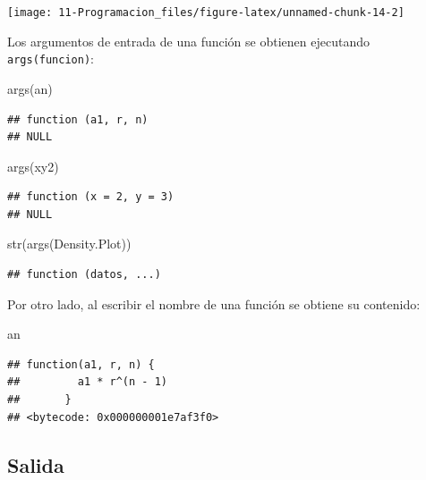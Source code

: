 \documentclass[
]{book}
\newenvironment{Shaded}{\begin{snugshade}}{\end{snugshade}}
\newcommand{\FunctionTok}[1]{\textcolor[rgb]{0.00,0.00,0.00}{#1}}
\newcommand{\NormalTok}[1]{#1}
\theoremstyle{break}
\theoremstyle{nonumberplain}
\begin{document}
\begin{center}\texttt{[image: 11-Programacion\_files/figure-latex/unnamed-chunk-14-2]} \end{center}

Los argumentos de entrada de una función se obtienen ejecutando \texttt{args(funcion)}:

\begin{Shaded}
\begin{Highlighting}[]
\FunctionTok{args}\NormalTok{(an)}
\end{Highlighting}
\end{Shaded}

\begin{verbatim}
## function (a1, r, n) 
## NULL
\end{verbatim}

\begin{Shaded}
\begin{Highlighting}[]
\FunctionTok{args}\NormalTok{(xy2)}
\end{Highlighting}
\end{Shaded}

\begin{verbatim}
## function (x = 2, y = 3) 
## NULL
\end{verbatim}

\begin{Shaded}
\begin{Highlighting}[]
\FunctionTok{str}\NormalTok{(}\FunctionTok{args}\NormalTok{(Density.Plot))}
\end{Highlighting}
\end{Shaded}

\begin{verbatim}
## function (datos, ...)
\end{verbatim}

Por otro lado, al escribir el nombre de una función se obtiene su
contenido:

\begin{Shaded}
\begin{Highlighting}[]
\NormalTok{an}
\end{Highlighting}
\end{Shaded}

\begin{verbatim}
## function(a1, r, n) {
##         a1 * r^(n - 1)
##       }
## <bytecode: 0x000000001e7af3f0>
\end{verbatim}

\hypertarget{salida}{%
\subsection{Salida}\label{salida}}
\end{document}
